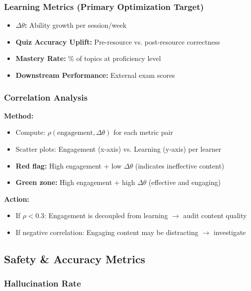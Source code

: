 \documentclass[11pt,letterpaper]{article}
\begin{document}
\subsubsection{Learning Metrics (Primary Optimization Target)}\label{subsubsec:learning-metrics}

\begin{itemize}
\item \textbf{$\Delta\theta$:} Ability growth per session/week
\item \textbf{Quiz Accuracy Uplift:} Pre-resource vs. post-resource correctness
\item \textbf{Mastery Rate:} \% of topics at proficiency level
\item \textbf{Downstream Performance:} External exam scores
\end{itemize}

\subsubsection{Correlation Analysis}\label{subsubsec:correlation-analysis}

\textbf{Method:}
\begin{itemize}
\item Compute: $\rho(\text{engagement}, \Delta\theta)$ for each metric pair
\item Scatter plots: Engagement (x-axis) vs. Learning (y-axis) per learner
\item \textbf{Red flag:} High engagement + low $\Delta\theta$ (indicates ineffective content)
\item \textbf{Green zone:} High engagement + high $\Delta\theta$ (effective and engaging)
\end{itemize}

\textbf{Action:}
\begin{itemize}
\item If $\rho < 0.3$: Engagement is decoupled from learning $\rightarrow$ audit content quality
\item If negative correlation: Engaging content may be distracting $\rightarrow$ investigate
\end{itemize}

\subsection{Safety \& Accuracy Metrics}\label{subsec:safety-accuracy-metrics}

\subsubsection{Hallucination Rate}\label{subsubsec:hallucination-rate}
\end{document}
